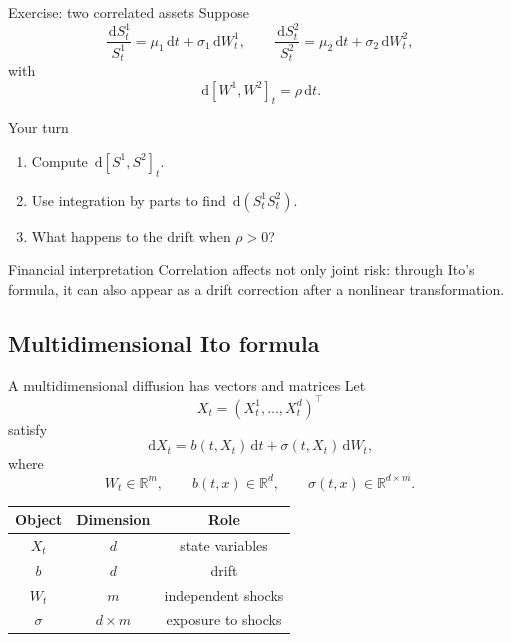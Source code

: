 \documentclass[handout,10pt,aspectratio=169]{beamer}
\newcommand{\R}{\mathbb R}
\newcommand{\dd}{\,\mathrm d}
\begin{document}
\begin{frame}{Exercise: two correlated assets}
Suppose
\[
\frac{\dd S_t^1}{S_t^1}
=
\mu_1\dd t+\sigma_1\dd W_t^1,
\qquad
\frac{\dd S_t^2}{S_t^2}
=
\mu_2\dd t+\sigma_2\dd W_t^2,
\]
with
\[
\dd[W^1,W^2]_t=\rho\dd t.
\]

\begin{block}{Your turn}
\begin{enumerate}
    \item Compute \(\dd[S^1,S^2]_t\).
    \item Use integration by parts to find
    \(\dd(S_t^1S_t^2)\).
    \item What happens to the drift when \(\rho>0\)?
\end{enumerate}
\end{block}

\begin{alertblock}{Financial interpretation}
Correlation affects not only joint risk: through Ito's formula, it can also
appear as a drift correction after a nonlinear transformation.
\end{alertblock}
\end{frame}


\subsection{Multidimensional Ito formula}

\begin{frame}{A multidimensional diffusion has vectors and matrices}
Let
\[
X_t=(X_t^1,\ldots,X_t^d)^\top
\]
satisfy
\[
\boxed{
\dd X_t
=
b(t,X_t)\dd t
+
\sigma(t,X_t)\dd W_t,}
\]
where
\[
W_t\in\R^m,\qquad
b(t,x)\in\R^d,\qquad
\sigma(t,x)\in\R^{d\times m}.
\]

\begin{center}
\begin{tabular}{ccc}
\toprule
Object & Dimension & Role\\
\midrule
\(X_t\) & \(d\) & state variables\\
\(b\) & \(d\) & drift\\
\(W_t\) & \(m\) & independent shocks\\
\(\sigma\) & \(d\times m\) & exposure to shocks\\
\bottomrule
\end{tabular}
\end{center}
\end{frame}
\end{document}

